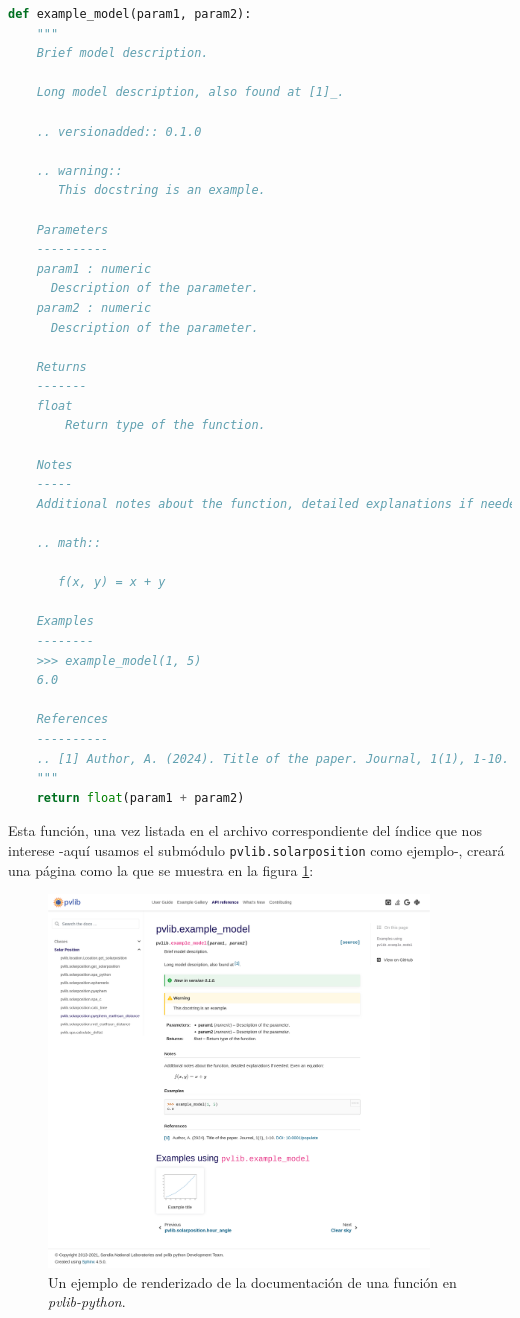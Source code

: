 \begin{lstlisting}[language=Python, caption={Ejemplo de documentación de una función en \textit{pvlib-python}.}, label={lst:doc_function_example}]
def example_model(param1, param2):
    """
    Brief model description.

    Long model description, also found at [1]_.

    .. versionadded:: 0.1.0

    .. warning::
       This docstring is an example.

    Parameters
    ----------
    param1 : numeric
      Description of the parameter.
    param2 : numeric
      Description of the parameter.

    Returns
    -------
    float
        Return type of the function.

    Notes
    -----
    Additional notes about the function, detailed explanations if needed. Even an equation:

    .. math::

       f(x, y) = x + y

    Examples
    --------
    >>> example_model(1, 5)
    6.0

    References
    ----------
    .. [1] Author, A. (2024). Title of the paper. Journal, 1(1), 1-10. :doi:`10.0001/populate`
    """
    return float(param1 + param2)
\end{lstlisting}

Esta función, una vez listada en el archivo correspondiente del índice que nos interese -aquí usamos el submódulo \lstinline{pvlib.solarposition} como ejemplo-, creará una página como la que se muestra en la figura \ref{fig:doc_function_example}:

\begin{figure}[H]
    \centering
    \includegraphics[width=0.9\textwidth]{./images/doc_example/function_stretch.png}
    \caption{Un ejemplo de renderizado de la documentación de una función en \textit{pvlib-python}.}
    \label{fig:doc_function_example}
\end{figure}

